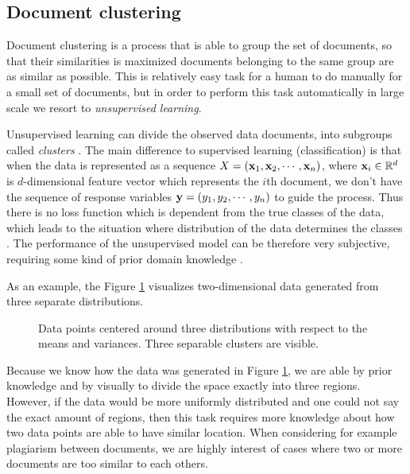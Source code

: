 \subsection{Document clustering}

Document clustering is a process that is able to group the set of documents, so that their similarities is maximized \ie documents belonging to the same group are as similar as possible. This is relatively easy task for a human to do manually for a small set of documents, but in order to perform this task automatically in large scale we resort to \emph{unsupervised learning}. 

Unsupervised learning can divide the observed data \ie documents, into subgroups called \emph{clusters} \cite{hastie_09_elements-of.statistical-learning}. The main difference to supervised learning (classification) is that when the data is represented as a sequence $X = (\mathbf{x}_1, \mathbf{x}_2, \cdots, \mathbf{x}_n)$, where $\mathbf{x}_i \in \mathbb{R}^d$ is $d$-dimensional feature vector which represents the $i$th document, we don't have the sequence of response variables $\mathbf{y} = (y_1, y_2, \cdots, y_n)$ to guide the process. Thus there is no loss function which is dependent from the true classes of the data, which leads to the situation where distribution of the data determines the classes \cite{Manning:2008:IIR:1394399}. The performance of the unsupervised model can be therefore very subjective, requiring some kind of prior domain knowledge \cite{hastie_09_elements-of.statistical-learning}. 

As an example, the Figure \ref{fig-clust-example} visualizes two-dimensional data generated from three separate distributions. 

\begin{figure}[ht]
\centering
\setlength\figureheight{7cm}
\setlength\figurewidth{7cm}

\caption{Data points centered around three distributions with respect to the means and variances. Three separable clusters are visible.} \label{fig-clust-example}
\end{figure}

\noindent
Because we know how the data was generated in Figure \ref{fig-clust-example}, we are able by prior knowledge and by visually to divide the space exactly into three regions. However, if the data would be more uniformly distributed and one could not say the exact amount of regions, then this task requires more knowledge about how two data points are able to have similar location. When considering for example plagiarism between documents, we are highly interest of cases where two or more documents are too similar to each others. 

